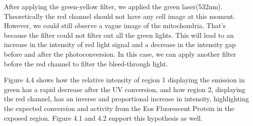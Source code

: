 \documentclass[a4paper,english,12pt,bibliography=totoc]{scrreprt}
\begin{document}
After applying the green-yellow filter, we applied the green laser(532nm). Theoretically the red channel should not have any cell image at this moment. However, we could still observe a vague image of the mitochondria. That's because the filter could not filter out all the green lights. This will lead to an increase in the intensity of red light signal and a decrease in the intensity gap before and after the photoconversion. In this case, we can apply another filter before the red channel to filter the bleed-through light.

Figure 4.4 shows how the relative intensity of region 1 displaying the emission in green has a rapid decrease after the UV conversion, and how region 2, displaying the red channel, has an inverse and proportional increase in intensity, highlighting the expected conversion and activity from the Eos Fluorescent Protein in the exposed region.
Figure 4.1 and 4.2 support this hypothesis as well.

\printbibliography
\end{document}
